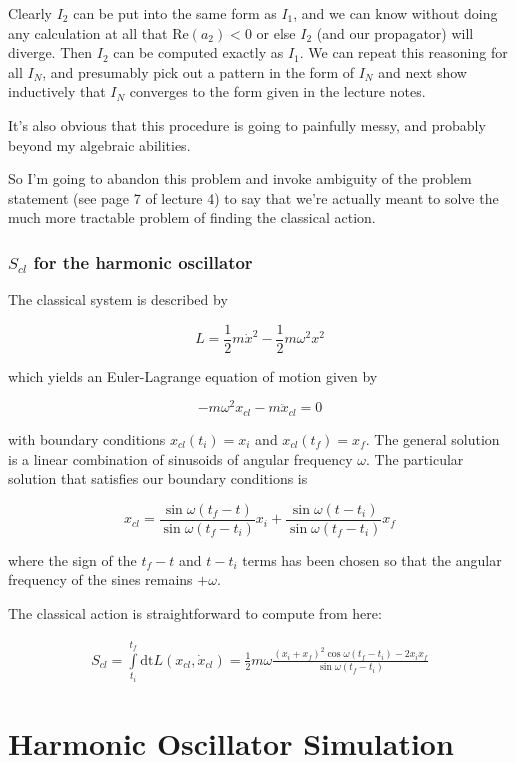 \documentclass[12pt]{article}
\begin{document}
Clearly \(I_2\) can be put into the same form as \(I_1\), and we can know without doing any calculation at all that \(\mathrm{Re}(a_2)<0\) or else \(I_2\) (and our propagator) will diverge. Then \(I_2\) can be computed exactly as \(I_1\). We can repeat this reasoning for all \(I_N\), and presumably pick out a pattern in the form of \(I_N\) and next show inductively that \(I_N\) converges to the form given in the lecture notes.

It's also obvious that this procedure is going to painfully messy, and probably beyond my algebraic abilities.

So I'm going to abandon this problem and invoke ambiguity of the problem statement (see page 7 of lecture 4) to say that we're actually meant to solve the much more tractable problem of finding the classical action.

\subsubsection*{\(S_{cl}\) for the harmonic oscillator}

The classical system is described by

\[L = \frac{1}{2}m\dot{x}^2 - \frac{1}{2}m\omega^2 x^2
\]

which yields an Euler-Lagrange equation of motion given by

\[-m\omega^2 x_{cl} - m\ddot{x}_{cl} = 0
\]

with boundary conditions \(x_{cl}(t_i) = x_i\) and \(x_{cl}(t_f) = x_f\). The general solution is a linear combination of sinusoids of angular frequency \(\omega\). The particular solution that satisfies our boundary conditions is

\[x_{cl} = \frac{\sin\omega(t_f-t)}{\sin\omega(t_f-t_i)}x_i + \frac{\sin\omega(t-t_i)}{\sin\omega(t_f-t_i)}x_f
\]

where the sign of the \( t_f -t \) and \( t - t_i \) terms has been chosen so that the angular frequency of the sines remains \(+\omega\).

The classical action is straightforward to compute from here:

\begin{align*}
S_{cl} = \int\limits_{t_i}^{t_f}\mathrm{dt}L(x_{cl},\dot{x}_{cl}) = \frac{1}{2}m\omega\frac{(x_i+x_f)^2\cos\omega(t_f-t_i) - 2x_ix_f}{\sin\omega(t_f-t_i)}
\end{align*}

\section{Harmonic Oscillator Simulation}


 
\end{document}
